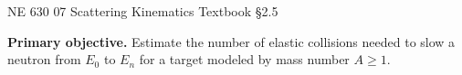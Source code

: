 \providecommand{\muc}{\mu_{\mathrm c}}
\providecommand{\mul}{\mu_{\mathrm L}}
\providecommand{\thetac}{\theta_{\mathrm c}}
\providecommand{\thetaL}{\theta_{\mathrm L}}
\providecommand{\varphiL}{\varphi_{\mathrm L}}
\providecommand{\vc}{v_{\mathrm c}}
\providecommand{\Vc}{V_{\mathrm c}}
\providecommand{\bvc}{\mathbf{v}_{\mathrm c}}
\providecommand{\bVc}{\mathbf{V}_{\mathrm c}}
\providecommand{\bVCM}{\mathbf{V}_{\mathrm{CM}}}
\providecommand{\VCM}{V_{\mathrm{CM}}}
\providecommand{\Expect}{\mathbb{E}}
\providecommand{\SourceEq}[1]{\par\nobreak\hfill{\sffamily\scriptsize\color{KSUGray}#1}\par}

\setlength{\abovedisplayskip}{4pt plus 1pt minus 1pt}
\setlength{\belowdisplayskip}{4pt plus 1pt minus 1pt}
\setlength{\abovedisplayshortskip}{3pt plus 1pt}
\setlength{\belowdisplayshortskip}{3pt plus 1pt}
\setlength{\jot}{2pt}

\HandoutSetup
  {NE 630}
  {07}
  {Scattering Kinematics}
  {Textbook \S2.5}


\MakeHandoutTitle

\textcolor{KSUDeepPurple}{\textbf{Primary objective.}}
Estimate the number of elastic collisions needed to slow a neutron from
$E_0$ to $E_n$ for a target modeled by mass number $A\geq1$.
\par\vspace{5pt}

